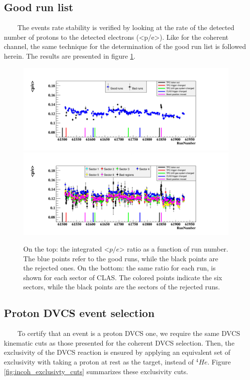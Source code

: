 \subsection{Good run list}
~~~~The events rate stability is verified by looking at the rate of the detected number of protons to the detected electrons (<p/e>). Like for the coherent channel, the same technique for the determination of the good run list is followed herein. The results are presented in figure \ref{fig:prot_over_e_Run_sec.png}. 
\begin{figure}[h!]
\includegraphics[scale=0.4]{fig_dvcs/prot_over_e_Run.png}
\includegraphics[scale=0.4]{fig_dvcs/prot_over_e_Run_sec.png}
\caption{On the top: the integrated <$p/e$> ratio as a function of run number. The blue points refer to the good runs, while the black points are the rejected ones. On the bottom: the same ratio for each run, is shown for each sector of CLAS. The colored points indicate the six sectors, while the black points are the sectors of the rejected runs. } 
\label{fig:prot_over_e_Run_sec.png}
\end{figure}


\subsection{Proton DVCS event selection}
~~~~To certify that an event is a proton DVCS one, we require the same DVCS kinematic cuts as those presented for the coherent DVCS selection. Then, the exclusivity of the DVCS reaction is ensured by applying an equivalent set of exclusivity with taking a proton at rest as the target, instead of $^4He$. Figure \ref{fig:incoh_exclusivty_cuts} summarizes these exclusivity cuts.\\

